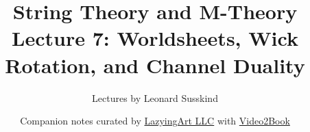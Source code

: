 \documentclass[11pt,oneside]{book}
\begin{document}
\hypersetup{pageanchor=false}
\frontmatter
\title{String Theory and M-Theory\\[0.45em]
\large Lecture 7: Worldsheets, Wick Rotation, and Channel Duality}
\author{Lectures by Leonard Susskind}
\date{Companion notes curated by
\href{https://lazying.art}{LazyingArt LLC} with
\href{https://github.com/lachlanchen/Video2Book}{Video2Book}}
\maketitle
\clearpage
\hypersetup{pageanchor=true}
\mainmatter

\end{document}
